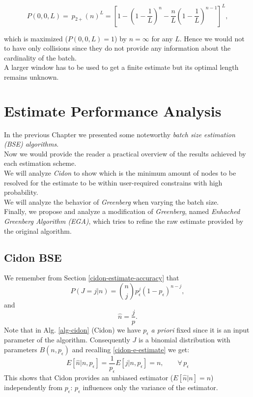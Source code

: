 \documentclass[11pt,a4paper,twoside,openright]{book}
\newcommand{\pc}{p_{\epsilon}}
\begin{document}
\begin{equation}
P(0,0,L)=\ p_{2+}(n)^{L} = \left[1-\left(1-\frac{1}{L}\right)^{n}-\frac{n}{L}\left(1-\frac{1}{L}\right)^{n-1}\right]^{L},
\end{equation}

\noindent which is maximized ($P(0,0,L)=1$) by $n=\infty$ for any $L$. Hence we would not to have only collisions since they do not provide any information about the cardinality of the batch.\\ A larger  window has to be used to get a finite estimate but its optimal length remains unknown.

\chapter{Estimate Performance Analysis}
\label{ch:Performance Analysis}

In the previous Chapter we presented some noteworthy  \emph{batch size estimation  (BSE) algorithms}.\\ Now we would provide the reader a practical overview of the results achieved by each estimation scheme.\\
We will analyze \emph{Cidon} to show which is the minimum amount of nodes to be resolved for the estimate to be within user-required constrains with high probability.\\  
We will analyze the behavior of \emph{Greenberg} when varying the batch size.\\
Finally, we propose and analyze a modification of \emph{Greenberg}, named \emph{Enhached Greenberg Algorithm (EGA)}, which tries to refine the raw estimate provided by the original algorithm.
\section{Cidon BSE}

\begin{equation*}
\end{equation*}
We remember from Section \ref{cidon-estimate-accuracy} that
\begin{equation*}P(J=j|n)={n \choose j}\pc^{j}(1-\pc)^{n-j},\end{equation*}
and
\begin{equation*}\hat{n}=\frac{j}{p}.\end{equation*}
Note that  in Alg. \ref{alg-cidon} (Cidon) we have $\pc$ \emph{a priori} fixed since it is an input parameter of the algorithm. Consequently $J$ is a binomial distribution with parameters $B(n,\pc)$ and recalling \eqref{cidon-e-estimate}
we get:
\begin{equation}
E[\hat{n}|n,\pc]=\frac{1}{\pc}E\left[j|n,\pc\right]=n, \qquad \forall \,\pc
\end{equation}
This shows that Cidon provides an unbiased estimator ($E[\hat{n}|n]=n$) independently from $\pc$: $\pc$ influences only the variance of the estimator. 
\end{document}

